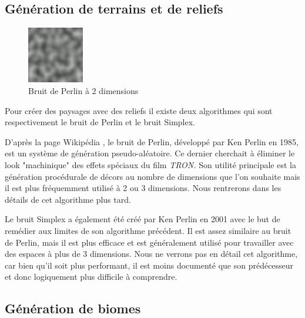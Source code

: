 \documentclass{article}
\begin{document}
\subsection{Génération de terrains et de reliefs}

\begin{figure} %
  \centering
  \includegraphics[width=0.22\textwidth]{assets/Perlin_noise.jpg}
  \caption{Bruit de Perlin à 2 dimensions}
  \label{perlin}
\end{figure}

Pour créer des paysages avec des reliefs il existe deux algorithmes qui sont respectivement le bruit de Perlin et le bruit Simplex.\par
D'après la page Wikipédia \cite{perlin}, le bruit de Perlin, développé par Ken Perlin en 1985, est un système de génération pseudo-aléatoire. Ce dernier cherchait à éliminer le look "machinique" des effets spéciaux du film \textit{TRON.} Son utilité principale est la génération procédurale de décors au nombre de dimensions que l'on souhaite mais il est plus fréquemment utilisé à 2 ou 3 dimensions. Nous rentrerons dans les détails de cet algorithme plus tard.\par
Le bruit Simplex \cite{simplex_noise} a également été créé par Ken Perlin en 2001 avec le but de remédier aux limites de son algorithme précédent. Il est assez similaire au bruit de Perlin, mais il est plus efficace et est généralement utilisé pour travailler avec des espaces à plus de 3 dimensions. Nous ne verrons pas en détail cet algorithme, car bien qu'il soit plus performant, il est moins documenté que son prédécesseur et donc logiquement plus difficile à comprendre.

\subsection{Génération de biomes}
\end{document}
